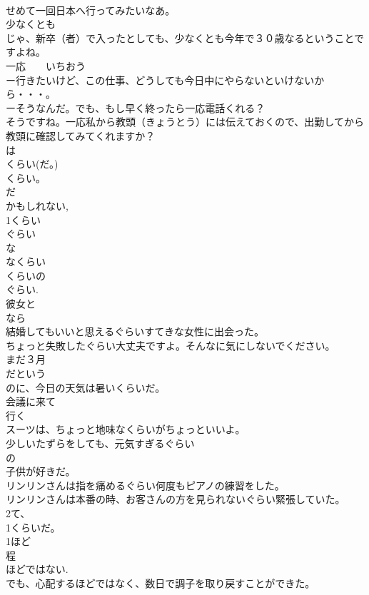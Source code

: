 \documentclass[8pt]{extreport}
\begin{document}
\begin{CJK}{UTF8}{min}
\\	せめて一回日本へ行ってみたいなあ。
\\	少なくとも
\\	じゃ、新卒（者）で入ったとしても、少なくとも今年で３０歳なるということですよね。
\\	一応　　いちおう
\\	ー行きたいけど、この仕事、どうしても今日中にやらないといけないから・・・。
\\	ーそうなんだ。でも、もし早く終ったら一応電話くれる？
\\	そうですね。一応私から教頭（きょうとう）には伝えておくので、出勤してから教頭に確認してみてくれますか？
\\	は
\\	くらい(だ。)
\\	くらい。　
\\	だ 
\\	かもしれない, 
\\	1くらい
\\	ぐらい
\\	な
\\	なくらい
\\	くらいの
\\	ぐらい. 
\\	彼女と
\\	なら
\\	結婚してもいいと思えるぐらいすてきな女性に出会った。
\\	ちょっと失敗したぐらい大丈夫ですよ。そんなに気にしないでください。
\\	まだ３月
\\	だという
\\	のに、今日の天気は暑いくらいだ。
\\	会議に来て
\\	行く
\\	スーツは、ちょっと地味なくらいがちょっといいよ。
\\	少しいたずらをしても、元気すぎるぐらい
\\	の
\\	子供が好きだ。
\\	リンリンさんは指を痛めるぐらい何度もピアノの練習をした。
\\	リンリンさんは本番の時、お客さんの方を見られないぐらい緊張していた。
\\	2て、
\\	1くらいだ。
\\	1ほど
\\	程 
\\	ほどではない. 
\\	でも、心配するほどではなく、数日で調子を取り戻すことができた。

\end{CJK}
\end{document}
